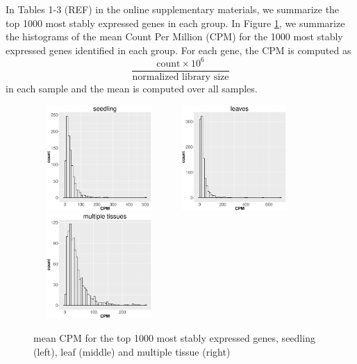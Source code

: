 \documentclass[11pt, a4paper]{article}
\begin{document}
In Tables 1-3 (REF) in the online supplementary materials, we summarize the
top 1000 most stably expressed genes in each group.  In Figure \ref{cpm}, we
summarize the histograms of the mean Count Per Million (CPM) for the 1000
most stably expressed genes identified in each group. For each gene, the CPM
is computed as \[ \dfrac{ \text{count} \times 10^6 }{ \text{normalized library
size}} \] in each sample and the mean is computed over all samples.
 
\begin{figure}[] \begin{center}
    \includegraphics[width=5cm,height=4cm]{Figures/cpm_seedling.eps}
    \includegraphics[width=5cm,height=4cm]{Figures/cpm_leaves.eps}
    \includegraphics[width=5cm,height=4cm]{Figures/cpm_tissue.eps}
    \caption{{\small{\label{cpm} mean CPM for the top 1000 most stably
    expressed genes, seedling (left), leaf (middle) and multiple tissue
    (right) }}} \end{center} 
\end{figure} 
\end{document}
